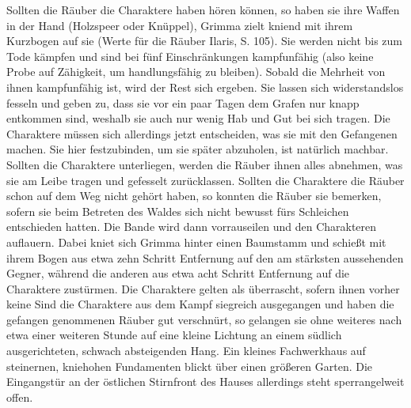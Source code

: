 Sollten die Räuber die Charaktere haben hören können, so haben sie ihre Waffen in der Hand (Holzspeer oder Knüppel), Grimma zielt kniend mit ihrem Kurzbogen auf sie (Werte für die Räuber Ilaris, S. 105). Sie werden nicht bis zum Tode kämpfen und sind bei fünf Einschränkungen kampfunfähig (also keine Probe auf Zähigkeit, um handlungsfähig zu bleiben). Sobald die Mehrheit von ihnen kampfunfähig ist, wird der Rest sich ergeben. Sie lassen sich widerstandslos fesseln und geben zu, dass sie vor ein paar Tagen dem Grafen nur knapp entkommen sind, weshalb sie auch nur wenig Hab und Gut bei sich tragen. Die Charaktere müssen sich allerdings jetzt entscheiden, was sie mit den Gefangenen machen. Sie hier festzubinden, um sie später abzuholen, ist natürlich machbar.
Sollten die Charaktere unterliegen, werden die Räuber ihnen alles abnehmen, was sie am Leibe tragen und gefesselt zurücklassen. 
\platz
{}
\platz
Sollten die Charaktere die Räuber schon auf dem Weg nicht gehört haben, so konnten die Räuber sie bemerken, sofern sie beim Betreten des Waldes sich nicht bewusst fürs Schleichen entschieden hatten. Die Bande wird dann vorrauseilen und den Charakteren auflauern. Dabei kniet sich Grimma hinter einen Baumstamm und schießt mit ihrem Bogen aus etwa zehn Schritt Entfernung auf den am stärksten aussehenden Gegner, während die anderen aus etwa acht Schritt Entfernung auf die Charaktere zustürmen. Die Charaktere gelten als überrascht, sofern ihnen vorher keine 
\platz
{}
\platz
{}
\platz
{}
\platz
Sind die Charaktere aus dem Kampf siegreich ausgegangen und haben die gefangen genommenen Räuber gut verschnürt, so gelangen sie ohne weiteres nach etwa einer weiteren Stunde auf eine kleine Lichtung an einem südlich ausgerichteten, schwach absteigenden Hang. Ein kleines Fachwerkhaus auf steinernen, kniehohen Fundamenten blickt über einen größeren Garten. Die Eingangstür an der östlichen Stirnfront des Hauses allerdings steht sperrangelweit offen.
